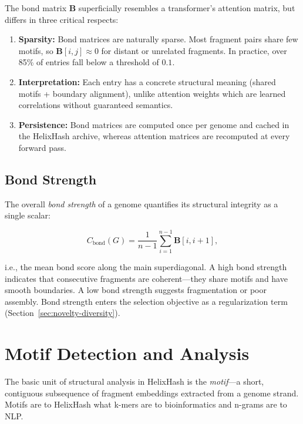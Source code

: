 \begin{keyinsight}
The bond matrix $\mathbf{B}$ superficially resembles a transformer's attention matrix, but differs in three critical respects:
\begin{enumerate}[leftmargin=1.5em]
  \item \textbf{Sparsity:} Bond matrices are naturally sparse. Most fragment pairs share few motifs, so $\mathbf{B}[i,j] \approx 0$ for distant or unrelated fragments. In practice, over 85\% of entries fall below a threshold of $0.1$.
  \item \textbf{Interpretation:} Each entry has a concrete structural meaning (shared motifs + boundary alignment), unlike attention weights which are learned correlations without guaranteed semantics.
  \item \textbf{Persistence:} Bond matrices are computed once per genome and cached in the HelixHash archive, whereas attention matrices are recomputed at every forward pass.
\end{enumerate}
\end{keyinsight}

\subsection{Bond Strength}

The overall \emph{bond strength} of a genome quantifies its structural integrity as a single scalar:

\begin{equation}
C_{\text{bond}}(G) = \frac{1}{n - 1} \sum_{i=1}^{n-1} \mathbf{B}[i, i+1],
\label{eq:bond-strength}
\end{equation}

i.e., the mean bond score along the main superdiagonal. A high bond strength indicates that consecutive fragments are coherent---they share motifs and have smooth boundaries. A low bond strength suggests fragmentation or poor assembly. Bond strength enters the selection objective as a regularization term (Section~\ref{sec:novelty-diversity}).

\section{Motif Detection and Analysis}
\label{sec:motif-extraction}

The basic unit of structural analysis in HelixHash is the \emph{motif}---a short, contiguous subsequence of fragment embeddings extracted from a genome strand. Motifs are to HelixHash what k-mers are to bioinformatics and n-grams are to NLP.

